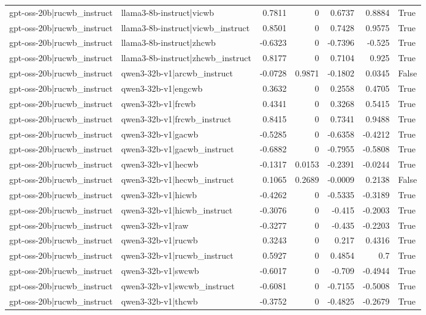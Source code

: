 \begin{table}
\begin{tabular}{l l r r r r l}
gpt-oss-20b|rucwb_instruct & llama3-8b-instruct|vicwb & 0.7811 & 0 & 0.6737 & 0.8884 & True \\
gpt-oss-20b|rucwb_instruct & llama3-8b-instruct|vicwb_instruct & 0.8501 & 0 & 0.7428 & 0.9575 & True \\
gpt-oss-20b|rucwb_instruct & llama3-8b-instruct|zhcwb & -0.6323 & 0 & -0.7396 & -0.525 & True \\
gpt-oss-20b|rucwb_instruct & llama3-8b-instruct|zhcwb_instruct & 0.8177 & 0 & 0.7104 & 0.925 & True \\
gpt-oss-20b|rucwb_instruct & qwen3-32b-v1|arcwb_instruct & -0.0728 & 0.9871 & -0.1802 & 0.0345 & False \\
gpt-oss-20b|rucwb_instruct & qwen3-32b-v1|engcwb & 0.3632 & 0 & 0.2558 & 0.4705 & True \\
gpt-oss-20b|rucwb_instruct & qwen3-32b-v1|frcwb & 0.4341 & 0 & 0.3268 & 0.5415 & True \\
gpt-oss-20b|rucwb_instruct & qwen3-32b-v1|frcwb_instruct & 0.8415 & 0 & 0.7341 & 0.9488 & True \\
gpt-oss-20b|rucwb_instruct & qwen3-32b-v1|gacwb & -0.5285 & 0 & -0.6358 & -0.4212 & True \\
gpt-oss-20b|rucwb_instruct & qwen3-32b-v1|gacwb_instruct & -0.6882 & 0 & -0.7955 & -0.5808 & True \\
gpt-oss-20b|rucwb_instruct & qwen3-32b-v1|hecwb & -0.1317 & 0.0153 & -0.2391 & -0.0244 & True \\
gpt-oss-20b|rucwb_instruct & qwen3-32b-v1|hecwb_instruct & 0.1065 & 0.2689 & -0.0009 & 0.2138 & False \\
gpt-oss-20b|rucwb_instruct & qwen3-32b-v1|hicwb & -0.4262 & 0 & -0.5335 & -0.3189 & True \\
gpt-oss-20b|rucwb_instruct & qwen3-32b-v1|hicwb_instruct & -0.3076 & 0 & -0.415 & -0.2003 & True \\
gpt-oss-20b|rucwb_instruct & qwen3-32b-v1|raw & -0.3277 & 0 & -0.435 & -0.2203 & True \\
gpt-oss-20b|rucwb_instruct & qwen3-32b-v1|rucwb & 0.3243 & 0 & 0.217 & 0.4316 & True \\
gpt-oss-20b|rucwb_instruct & qwen3-32b-v1|rucwb_instruct & 0.5927 & 0 & 0.4854 & 0.7 & True \\
gpt-oss-20b|rucwb_instruct & qwen3-32b-v1|swcwb & -0.6017 & 0 & -0.709 & -0.4944 & True \\
gpt-oss-20b|rucwb_instruct & qwen3-32b-v1|swcwb_instruct & -0.6081 & 0 & -0.7155 & -0.5008 & True \\
gpt-oss-20b|rucwb_instruct & qwen3-32b-v1|thcwb & -0.3752 & 0 & -0.4825 & -0.2679 & True \\

\end{tabular}
\end{table}
